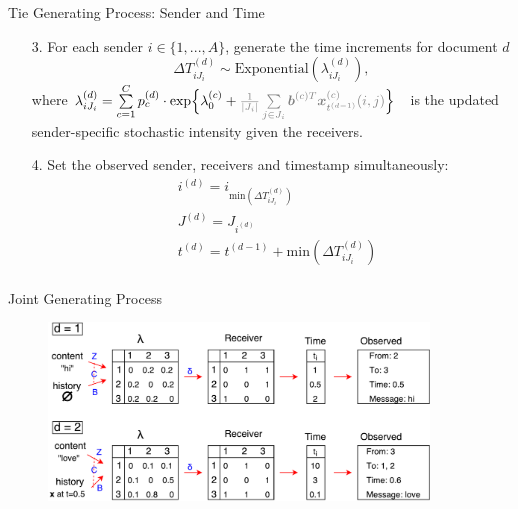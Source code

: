 \documentclass[10pt]{beamer}
\theoremstyle{definition}
\theoremstyle{remark}
\begin{document}
\begin{frame}{Tie Generating Process: Sender and Time}
\begin{itemize}
		\item [3.] For each sender $i \in \{1,...,A\}$, generate the time increments for document $d$
		\begin{equation*}
		\Delta T^{(d)}_{i{J_i}} \sim \mbox{Exponential}(\lambda_{i{J_i}}^{(d)}),
		\end{equation*}\normalsize
		where \footnotesize$\lambda^{(d)}_{iJ_i}= \sum\limits_{c=1}^{C} p^{(d)}_c\cdot\mbox{exp}\Big\{\lambda^{(c)}_0+\textcolor{gray}{\frac{1}{|J_i|}\sum\limits_{j \in J_i} \boldsymbol{b}^{(c)T}\boldsymbol{x}^{(c)}_{t^{(d-1)}}(i, j)}\Big\}\quad$\normalsize is the updated sender-specific stochastic intensity given the receivers.\vspace{0.4cm}
		\item[4.] Set the observed sender, receivers and timestamp simultaneously:
			\begin{equation*}
		\begin{aligned}
		&i^{(d)} = i_{\mbox{min}(\Delta T^{(d)}_{i{J_i}})} \\
		&J^{(d)} = J_{i^{(d)}}\\
		&t^{(d)} = t^{(d-1)}+\mbox{min}(\Delta T^{(d)}_{i{J_i}})\\
		\end{aligned}
		\end{equation*}
		\normalsize
\end{itemize}
\end{frame}

\begin{frame}{Joint Generating Process}

	\begin{figure}
		\includegraphics[width=0.9\textwidth]{figures/summary.pdf}
	\end{figure}	\vspace{0.1cm}

\end{frame}
\end{document}
